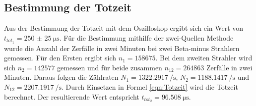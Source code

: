 \subsection{Bestimmung der Totzeit}
Aus der Bestimmung der Totzeit mit dem Oszilloskop ergibt sich ein Wert von $t_{tot_{1}}=\qty{250(25)}{\micro\second}$.
Für die Bestimmung mithilfe der zwei-Quellen Methode wurde die Anzahl der Zerfälle in zwei Minuten bei zwei Beta-minus Strahlern gemessen.
Für den Ersten ergibt sich $n_1=158675$.
Bei dem zweiten Strahler wird sich $n_2=142577$ gemessen und für beide zusammen $n_{12}=264863$ Zerfälle in zwei Minuten.
Daraus folgen die Zählraten $N_1=\qty{1322.2917}{\per\second}$, $N_2=\qty{1188.1417}{\per\second}$ und $N_{12}=\qty{2207.1917}{\per\second}$.
Durch Einsetzen in Formel \ref{eqn:Totzeit} wird die Totzeit berechnet.
Der resultierende Wert entspricht $t_{tot_2}=\qty{96.508}{\micro\second}$.